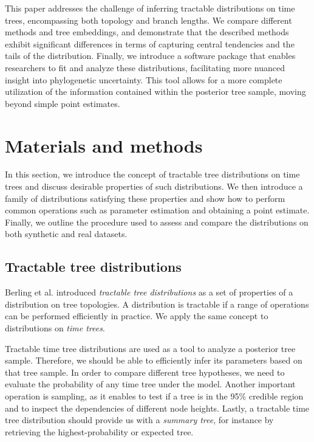\documentclass[10pt,letterpaper]{article}
\begin{document}
This paper addresses the challenge of inferring tractable distributions on time trees, encompassing both topology and branch lengths. We compare different methods and tree embeddings, and demonstrate that the described methods exhibit significant differences in terms of capturing central tendencies and the tails of the distribution. Finally, we introduce a software package that enables researchers to fit and analyze these distributions, facilitating more nuanced insight into phylogenetic uncertainty. This tool allows for a more complete utilization of the information contained within the posterior tree sample, moving beyond simple point estimates.

\section*{Materials and methods}

In this section, we introduce the concept of tractable tree distributions on time trees and discuss desirable properties of such distributions. We then introduce a family of distributions satisfying these properties and show how to perform common operations such as parameter estimation and obtaining a point estimate. Finally, we outline the procedure used to assess and compare the distributions on both synthetic and real datasets.

\subsection*{Tractable tree distributions}

Berling et al. \cite{ccd} introduced \emph{tractable tree distributions} as a set of properties of a distribution on tree topologies. A distribution is tractable if a range of operations can be performed efficiently in practice. We apply the same concept to distributions on \emph{time trees}.

Tractable time tree distributions are used as a tool to analyze a posterior tree sample. Therefore, we should be able to efficiently infer its parameters based on that tree sample. In order to compare different tree hypotheses, we need to evaluate the probability of any time tree under the model. Another important operation is sampling, as it enables to test if a tree is in the 95\% credible region and to inspect the dependencies of different node heights. Lastly, a tractable time tree distribution should provide us with a \emph{summary tree}, for instance by retrieving the highest-probability or expected tree.
\end{document}
